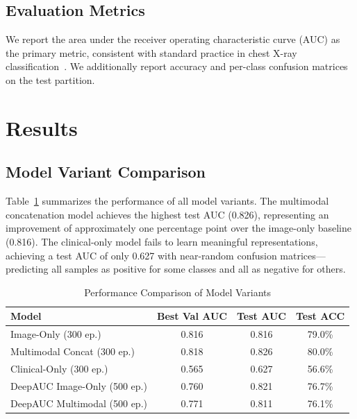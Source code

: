 \documentclass[conference]{IEEEtran}
\begin{document}
\subsection{Evaluation Metrics}

We report the area under the receiver operating characteristic curve (AUC) as the primary metric, consistent with standard practice in chest X-ray classification~\cite{irvin2019chexpert}. We additionally report accuracy and per-class confusion matrices on the test partition.

\section{Results}\label{sec:results}

\subsection{Model Variant Comparison}

Table~\ref{tab:results} summarizes the performance of all model variants. The multimodal concatenation model achieves the highest test AUC (0.826), representing an improvement of approximately one percentage point over the image-only baseline (0.816). The clinical-only model fails to learn meaningful representations, achieving a test AUC of only 0.627 with near-random confusion matrices---predicting all samples as positive for some classes and all as negative for others.

\begin{table}[htbp]
\caption{Performance Comparison of Model Variants}
\label{tab:results}
\begin{center}
\begin{tabular}{lccc}
\toprule
\textbf{Model} & \textbf{Best Val AUC} & \textbf{Test AUC} & \textbf{Test ACC} \\
\midrule
Image-Only (300 ep.) & 0.816 & 0.816 & 79.0\% \\
Multimodal Concat (300 ep.) & 0.818 & 0.826 & 80.0\% \\
Clinical-Only (300 ep.) & 0.565 & 0.627 & 56.6\% \\
\midrule
DeepAUC Image-Only (500 ep.) & 0.760 & 0.821 & 76.7\% \\
DeepAUC Multimodal (500 ep.) & 0.771 & 0.811 & 76.1\% \\
\bottomrule
\end{tabular}
\end{center}
\end{table}
\end{document}
